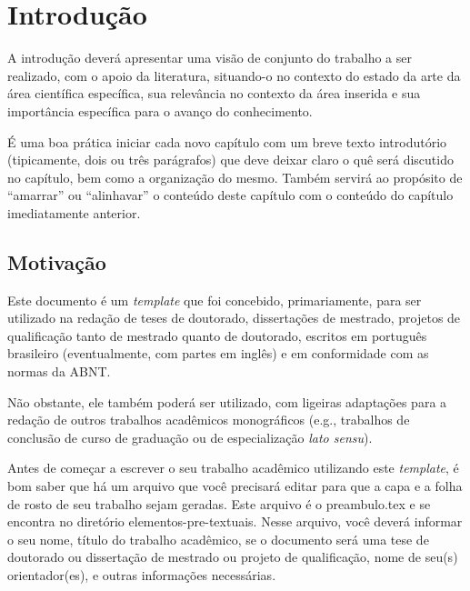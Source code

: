 
\chapter{Introdução}
\label{chap_introducao}

A introdução deverá apresentar uma visão de conjunto do trabalho a ser realizado, com o apoio da literatura, situando-o no contexto do estado da arte da área científica específica, sua relevância no contexto da área inserida e sua importância específica para o avanço do conhecimento.

É uma boa prática iniciar cada novo capítulo com um breve texto introdutório (tipicamente, dois ou três parágrafos) que deve deixar claro o quê será discutido no capítulo, bem como a organização do mesmo.
Também servirá ao propósito de ``amarrar'' ou ``alinhavar'' o conteúdo deste capítulo com o conteúdo do capítulo imediatamente anterior.

\section{Motivação}
\label{sec_motivacao}

Este documento é um \emph{template} que foi concebido, primariamente, para ser utilizado na redação de teses de doutorado, dissertações de mestrado, projetos de qualificação tanto de mestrado quanto de doutorado, escritos em português brasileiro (eventualmente, com partes em inglês) e em conformidade com as normas da ABNT.

Não obstante, ele também poderá ser utilizado, com ligeiras adaptações para a redação de outros trabalhos acadêmicos monográficos (e.g., trabalhos de conclusão de curso de graduação ou de especialização \emph{lato sensu}).

Antes de começar a escrever o seu trabalho acadêmico utilizando este \emph{template}, é bom saber que há um arquivo que você precisará editar para que a capa e a folha de rosto de seu trabalho sejam geradas.
Este arquivo é o {\color{red} preambulo.tex} e se encontra no diretório {\color{red} elementos-pre-textuais}.
Nesse arquivo, você deverá informar o seu nome, título do trabalho acadêmico, se o documento será uma tese de doutorado ou dissertação de mestrado ou projeto de qualificação, nome de seu(s) orientador(es), e outras informações necessárias.

